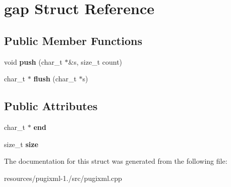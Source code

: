 \hypertarget{structgap}{\section{gap Struct Reference}
\label{structgap}
}
\subsection*{Public Member Functions}
\begin{DoxyCompactItemize}
\item 
\hypertarget{structgap_a9c0d0b12bc778c8439c8aec7747ab2b0}{void {\bfseries push} (char\+\_\+t $\ast$\&s, size\+\_\+t count)}\label{structgap_a9c0d0b12bc778c8439c8aec7747ab2b0}

\item 
\hypertarget{structgap_a176c58ee8d57c41b91ae9f00d5e8cab5}{char\+\_\+t $\ast$ {\bfseries flush} (char\+\_\+t $\ast$s)}\label{structgap_a176c58ee8d57c41b91ae9f00d5e8cab5}

\end{DoxyCompactItemize}
\subsection*{Public Attributes}
\begin{DoxyCompactItemize}
\item 
\hypertarget{structgap_a1fafd4d9909a3413f723f24e46dfde0e}{char\+\_\+t $\ast$ {\bfseries end}}\label{structgap_a1fafd4d9909a3413f723f24e46dfde0e}

\item 
\hypertarget{structgap_ad5bb3597ade78d89bbe0e300748ad508}{size\+\_\+t {\bfseries size}}\label{structgap_ad5bb3597ade78d89bbe0e300748ad508}

\end{DoxyCompactItemize}


The documentation for this struct was generated from the following file\+:\begin{DoxyCompactItemize}
\item 
resources/pugixml-\/1./src/pugixml.\+cpp\end{DoxyCompactItemize}
